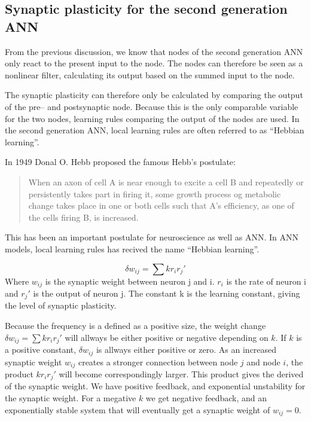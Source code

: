 	\subsection{Synaptic plasticity for the second generation ANN} %
	From the previous discussion, we know that nodes of the second generation ANN only react to the present input to the node.
	The nodes can therefore be seen as a nonlinear filter, calculating its output based on the summed input to the node.

	The synaptic plasticity can therefore only be calculated by comparing the output of the pre-- and postsynaptic node.
	Because this is the only comparable variable for the two nodes, learning rules comparing the output of the nodes are used. %
	In the second generation ANN, local learning rules are often referred to as ``Hebbian learning''.

	In 1949 Donal O. Hebb proposed the famous Hebb's postulate:
 	\begin{quote}
	When an axon of cell A is near enough to excite a cell B and repeatedly or persistently takes part in firing it, 
		some growth process og metabolic change takes place in one or both cells such that A's efficiency, as one of the cells firing B, is increased.\cite{Hebb1949Kap4}
	\end{quote}

	This has been an important postulate for neuroscience as well as ANN.
	In ANN models, local learning rules has recived the name ``Hebbian learning''.

	\begin{equation}
		\delta w_{ij} = \sum{k r_i r_j'}
	\end{equation}
 	Where $w_{ij}$ is the synaptic weight between neuron j and i. 
	$r_i$ is the rate of neuron i and $r_j'$ is the output of neuron j. 
	The constant \mbox{k} is the learning constant, giving the level of synaptic plasticity. 

	Because the frequency is a defined as a positive size, the weight change $\delta w_{ij} = \sum{k r_i r_j'}$ will allways be either positive or negative depending on $k$. 
	If $k$ is a positive constant, $\delta w_{ij}$ is allways either positive or zero.
	As an increased synaptic weight $w_{ij}$ creates a stronger connection between node $j$ and node $i$, the product $k r_i r_j'$ will become correspondingly larger.
	This product gives the derived of the synaptic weight.
	We have positive feedback, and exponential unstability for the synaptic weight.
	For a megative $k$ we get negative feedback, and an exponentially stable system that will eventually get a synaptic weight of $w_{ij}=0$.


